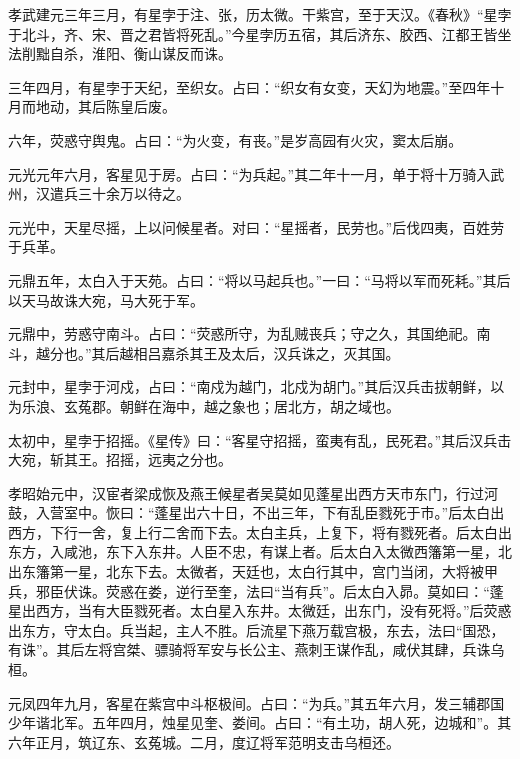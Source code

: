 \documentclass[12pt,UTF8]{ctexbook}
\begin{document}
孝武建元三年三月，有星孛于注、张，历太微。干紫宫，至于天汉。《春秋》“星孛于北斗，齐、宋、晋之君皆将死乱。”今星孛历五宿，其后济东、胶西、江都王皆坐法削黜自杀，淮阳、衡山谋反而诛。



三年四月，有星孛于天纪，至织女。占曰：“织女有女变，天幻为地震。”至四年十月而地动，其后陈皇后废。



六年，荧惑守舆鬼。占曰：“为火变，有丧。”是岁高园有火灾，窦太后崩。



元光元年六月，客星见于房。占曰：“为兵起。”其二年十一月，单于将十万骑入武州，汉遣兵三十余万以待之。



元光中，天星尽摇，上以问候星者。对曰：“星摇者，民劳也。”后伐四夷，百姓劳于兵革。



元鼎五年，太白入于天苑。占曰：“将以马起兵也。”一曰：“马将以军而死耗。”其后以天马故诛大宛，马大死于军。



元鼎中，劳惑守南斗。占曰：“荧惑所守，为乱贼丧兵；守之久，其国绝祀。南斗，越分也。”其后越相吕嘉杀其王及太后，汉兵诛之，灭其国。



元封中，星孛于河戍，占曰：“南戍为越门，北戍为胡门。”其后汉兵击拔朝鲜，以为乐浪、玄菟郡。朝鲜在海中，越之象也；居北方，胡之域也。



太初中，星孛于招摇。《星传》曰：“客星守招摇，蛮夷有乱，民死君。”其后汉兵击大宛，斩其王。招摇，远夷之分也。



孝昭始元中，汉宦者梁成恢及燕王候星者吴莫如见蓬星出西方天市东门，行过河鼓，入营室中。恢曰：“蓬星出六十日，不出三年，下有乱臣戮死于市。”后太白出西方，下行一舍，复上行二舍而下去。太白主兵，上复下，将有戮死者。后太白出东方，入咸池，东下入东井。人臣不忠，有谋上者。后太白入太微西籓第一星，北出东籓第一星，北东下去。太微者，天廷也，太白行其中，宫门当闭，大将被甲兵，邪臣伏诛。荧惑在娄，逆行至奎，法曰“当有兵”。后太白入昴。莫如曰：“蓬星出西方，当有大臣戮死者。太白星入东井。太微廷，出东门，没有死将。”后荧惑出东方，守太白。兵当起，主人不胜。后流星下燕万载宫极，东去，法曰“国恐，有诛”。其后左将宫桀、骠骑将军安与长公主、燕刺王谋作乱，咸伏其肆，兵诛乌桓。



元凤四年九月，客星在紫宫中斗枢极间。占曰：“为兵。”其五年六月，发三辅郡国少年谐北军。五年四月，烛星见奎、娄间。占曰：“有土功，胡人死，边城和”。其六年正月，筑辽东、玄菟城。二月，度辽将军范明支击乌桓还。
\end{document}
